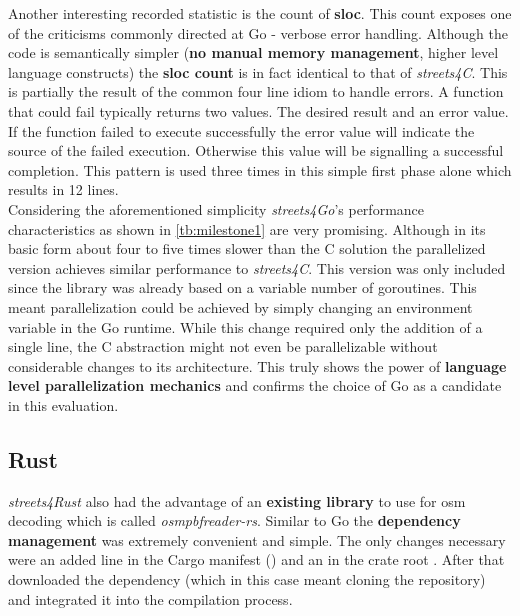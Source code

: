 Another interesting recorded statistic is the count of \textbf{\acrlong{sloc}}. This count exposes one of the criticisms commonly directed at Go - verbose error handling. Although the code is semantically simpler (\textbf{no manual memory management}, higher level language constructs) the \textbf{\gls{sloc} count} is in fact identical to that of \textit{streets4C}. This is partially the result of the common four line idiom to handle errors. A function that could fail typically returns two values. The desired result and an error value. If the function failed to execute successfully the error value will indicate the source of the failed execution. Otherwise this value will be  signalling a successful completion. This pattern is used three times in this simple first phase alone which results in 12 lines.
\\


Considering the aforementioned simplicity \textit{streets4Go}'s performance characteristics as shown in \autoref{tb:milestone1} are very promising. Although in its basic form about four to five times slower than the C solution the parallelized version achieves similar performance to \textit{streets4C}. This version was only included since the library was already based on a variable number of \glspl{goroutine}. This meant parallelization could be achieved by simply changing an environment variable in the Go runtime. While this change required only the addition of a single line, the C abstraction  might not even be parallelizable without considerable changes to its architecture. This truly shows the power of \textbf{language level parallelization mechanics} and confirms the choice of Go as a candidate in this evaluation.

\subsection{Rust}
\label{subsec:Implementation::Counting::Rust}

\textit{streets4Rust} also had the advantage of an \textbf{existing library} to use for \gls{osm} decoding which is called \textit{osmpbfreader-rs}. Similar to Go the \textbf{dependency management} was extremely convenient and simple. The only changes necessary were an added line in the Cargo manifest () and an  in the crate root . After that  downloaded the dependency (which in this case meant cloning the  repository) and integrated it into the compilation process.

